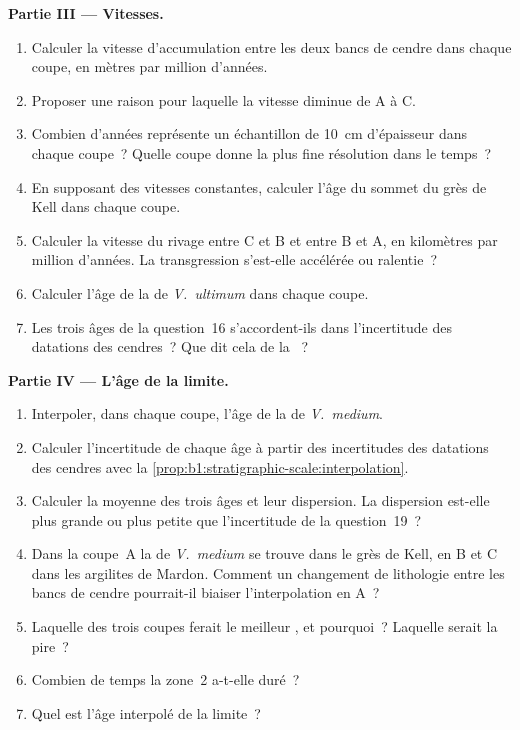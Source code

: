 \begin{problem}
\noindent\textbf{Partie III --- Vitesses.}
\begin{enumerate}[resume]
  \item Calculer la vitesse d'accumulation entre les deux bancs de cendre dans chaque
        coupe, en mètres par million d'années.
  \item Proposer une raison pour laquelle la vitesse diminue de A à C.
  \item Combien d'années représente un échantillon de \qty{10}{cm} d'épaisseur dans chaque
        coupe~? Quelle coupe donne la plus fine résolution dans le temps~?
  \item En supposant des vitesses constantes, calculer l'âge du sommet du grès de
        Kell dans chaque coupe.
  \item Calculer la vitesse du rivage entre C et B et entre B et A,
        en kilomètres par million d'années. La transgression s'est-elle accélérée ou ralentie~?
  \item Calculer l'âge de la  de \emph{V.~ultimum} dans chaque
        coupe.
  \item Les trois âges de la question~16 s'accordent-ils dans l'incertitude des
        datations des cendres~? Que dit cela de la ~?
\end{enumerate}

\noindent\textbf{Partie IV --- L'âge de la limite.}
\begin{enumerate}[resume]
  \item Interpoler, dans chaque coupe, l'âge de la  de
        \emph{V.~medium}.
  \item Calculer l'incertitude de chaque âge à partir des incertitudes des datations des cendres
        avec la \cref{prop:b1:stratigraphic-scale:interpolation}.
  \item Calculer la moyenne des trois âges et leur dispersion. La dispersion est-elle
        plus grande ou plus petite que l'incertitude de la question~19~?
  \item Dans la coupe~A la  de \emph{V.~medium} se trouve dans le grès de
        Kell, en B et C dans les argilites de Mardon. Comment un changement de
        lithologie entre les bancs de cendre pourrait-il biaiser l'interpolation en A~?
  \item Laquelle des trois coupes ferait le meilleur , et
        pourquoi~? Laquelle serait la pire~?
  \item Combien de temps la zone~2 a-t-elle duré~?
  \item Quel est l'âge interpolé de la limite~?
\end{enumerate}
\end{problem}

